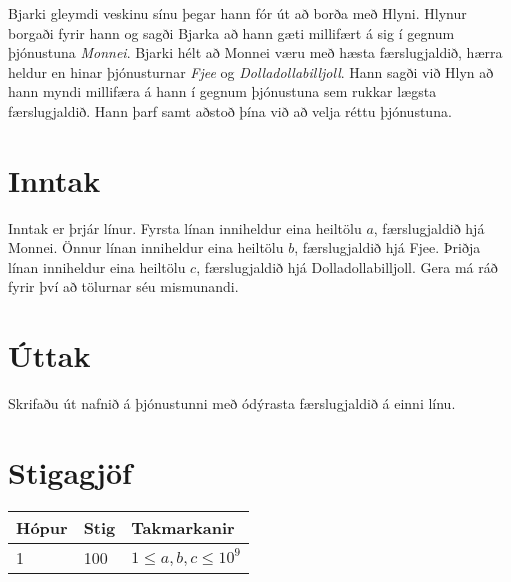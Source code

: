 
Bjarki gleymdi veskinu sínu þegar hann fór út að borða með Hlyni.
Hlynur borgaði fyrir hann og sagði Bjarka að hann gæti millifært á sig í gegnum þjónustuna \emph{Monnei}.
Bjarki hélt að Monnei væru með hæsta færslugjaldið, hærra heldur en hinar þjónusturnar \emph{Fjee} og \emph{Dolladollabilljoll}.
Hann sagði við Hlyn að hann myndi millifæra á hann í gegnum þjónustuna sem rukkar lægsta færslugjaldið.
Hann þarf samt aðstoð þína við að velja réttu þjónustuna.

\section*{Inntak}
Inntak er þrjár línur.
Fyrsta línan inniheldur eina heiltölu $a$, færslugjaldið hjá Monnei.
Önnur línan inniheldur eina heiltölu $b$, færslugjaldið hjá Fjee.
Þriðja línan inniheldur eina heiltölu $c$, færslugjaldið hjá Dolladollabilljoll.
Gera má ráð fyrir því að tölurnar séu mismunandi.

\section*{Úttak}
Skrifaðu út nafnið á þjónustunni með ódýrasta færslugjaldið á einni línu.

\section*{Stigagjöf}
\begin{tabular}{|l|l|l|}
\hline
Hópur & Stig & Takmarkanir \\ \hline
1     & 100   & $1 \leq a, b, c \leq 10^9$ \\ \hline
\end{tabular}

